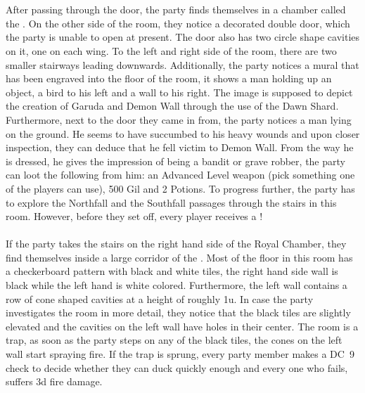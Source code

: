 %
\vfill
%
\\\\
%
After passing through the door, the party finds themselves in a chamber called the .
On the other side of the room, they notice a decorated double door, which the party is unable to open at present.
The door also has two circle shape cavities on it, one on each wing. 
To the left and right side of the room, there are two smaller stairways leading downwards.
Additionally, the party notices a mural that has been engraved into the floor of the room, it shows a man holding up an object, a bird to his left and a wall to his right.
The image is supposed to depict the creation of Garuda and Demon Wall through the use of the Dawn Shard.
Furthermore, next to the door they came in from, the party notices a man lying on the ground.
He seems to have succumbed to his heavy wounds and upon closer inspection, they can deduce that he fell victim to Demon Wall.
From the way he is dressed, he gives the impression of being a bandit or grave robber, the party can loot the following from him:
an Advanced Level weapon (pick something one of the players can use), 500 Gil and 2 Potions.
To progress further, the party has to explore the Northfall and the Southfall passages through the stairs in this room. 
However, before they set off, every player receives a !
%
%
\clearpage
%
\\\\
%
If the party takes the stairs on the right hand side of the Royal Chamber, they find themselves inside a large corridor of the .
Most of the floor in this room has a checkerboard pattern with black and white tiles, the right hand side wall is black while the left hand is white colored.
Furthermore, the left wall contains a row of cone shaped cavities at a height of roughly 1u.
In case the party investigates the room in more detail, they notice that the black tiles are slightly elevated and the cavities on the left wall have holes in their center.
The room is a trap, as soon as the party steps on any of the black tiles, the cones on the left wall start spraying fire.
If the trap is sprung, every party member makes a DC~9 check to decide whether they can duck quickly enough and every one who fails, suffers 3d fire damage.
